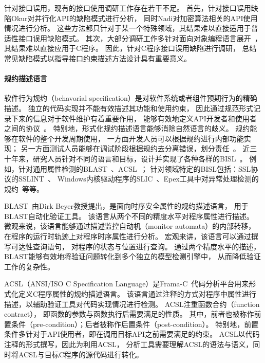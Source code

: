 针对接口误用，现有的接口使用调研工作存在若干不足。
首先，针对接口误用缺陷Okur对并行化API的缺陷模式进行分析，
同时Nadi对加密算法相关的API使用情况进行分析。
这些方法都只针对于某一个特殊领域，其结果难以直接适用于普适性接口误用缺陷模式。
其次，大部分调研工作多针对面向对象编程语言展开~\cite{16-icse-cry,17-tse-survey, 12-fse-parallel,12-fse-deprecation}，
其结果难以直接应用于C程序。
因此，针对C程序接口误用缺陷进行调研，
总结常见缺陷模式以指导接口约束描述方法设计具有重要意义。



\paragraph{规约描述语言}
软件行为规约（behavorial specification）是对软件系统或者组件预期行为的精确描述。
独立的代码实现并不能有效描述其功能和使用约束，
因此通过规范形式记录下来的信息对于软件维护有着重要作用，
能够有效地定义API开发者和使用者之间的协议~\cite{92-ieee-contract}。
特别地，形式化规约描述语言能够消除自然语言的歧义。
规约能够在软件的整个开发周期使用，
一方面开发人员可以根据规约进行内部功能实现；
另一方面测试人员能够在调试阶段根据规约去分离错误，划分责任~\cite{05-vstte-spec}。
近三十年来，研究人员针对不同的语言和目标，设计并实现了各种各样的BISL~\cite{survey12}。
例如，针对通用属性检测的BLAST~\cite{blast}、ACSL~\cite{acsl}；
针对领域特定的BISL包括：SSL协议的SSLINT~\cite{15-sp-sslint}、
Windows内核驱动程序的SLIC~\cite{01-slic}、Epex工具中对异常处理检测的规约~\cite{16-sec-epex}等等。


BLAST~\cite{blast}由Dirk Beyer教授提出，是面向时序安全属性的规约描述语言，
用于BLAST自动化验证工具。
该语言从两个不同的精度水平对程序属性进行描述。
微观来说，该语言能够通过描述监控自动机（monitor automata）的内部转移，
在程序的运行时轨迹上对程序时序属性进行分析。
宏观来讲，该语言可以通过撰写可达性查询语句，
对程序的状态与位置进行查询。
通过两个精度水平的描述，BLAST能够有效地将验证问题转化到多个独立的模型检测引擎中，
从而降低验证工作的复杂性。

ACSL（ANSI/ISO C Specification Language）是Frama-C~\cite{16-rv-framac}代码分析平台用来形式化定义C程序属性的规约描述语言。
该语言通过注释的方式对程序中属性进行描述，以辅助验证工具对代码实现情况进行检测。
ACSL注重函数合约（function contract），
即函数的参数与函数执行后需要满足的性质。
其中，前者也被称作前置条件（pre-condition）；后者被称作后置条件（post-condition）。
特别地，前置条件多针对于API使用者，即在调用目标API之前需要满足的约束。
ACSL以代码注释的形式撰写，因此为利用ACSL，
分析工具需要理解ACSL的语法与语义，同时将ACSL与目标C程序的源代码进行转化。


